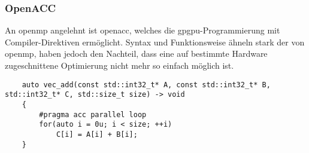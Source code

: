 \subsubsection{OpenACC{\textregistered}}

An \gls{openmp} angelehnt ist \gls{openacc}, welches die \gls{gpgpu}-Programmierung mit Compiler-Direktiven
ermöglicht. Syntax und Funktionsweise ähneln stark der von \gls{openmp}, haben jedoch den Nachteil, dass eine auf
bestimmte Hardware zugeschnittene Optimierung nicht mehr so einfach möglich ist.

\begin{verbatim}
    auto vec_add(const std::int32_t* A, const std::int32_t* B, std::int32_t* C, std::size_t size) -> void
    {
        #pragma acc parallel loop
        for(auto i = 0u; i < size; ++i)
            C[i] = A[i] + B[i];
    }
\end{verbatim}
